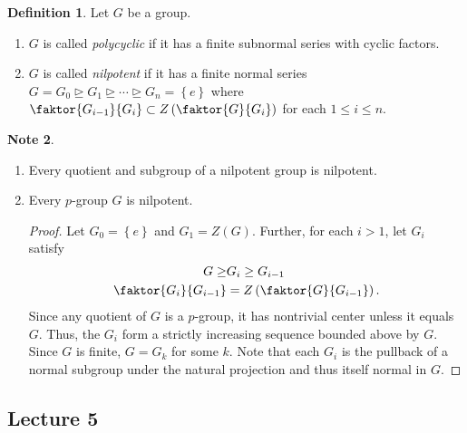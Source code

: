 \documentclass[10pt,letterpaper,cm]{nupset}
\theoremstyle{definition}
\newtheorem{definition}{Definition}[subsection]
\newtheorem{note}[definition]{Note}
\theoremstyle{theorem}
\theoremstyle{remark}
\newcommand{\1}{\mathbf{1}}
\newcommand{\0}{\vec 0}
\begin{document}
\begin{definition}{Let $G$ be a group.}
\begin{enumerate}
\item $G$ is called \textit{polycyclic} if it has a finite subnormal series with cyclic factors.
\item $G$ is called \textit{nilpotent} if it has a finite normal series  $G =G_0 \unrhd G_1 \unrhd \cdots \unrhd G_n = \left\{e\right\}$ where $\faktor{G_{i-1}}{G_i}\subset Z\left(\faktor{G}{G_i}\right)$ for each $1\leq i\leq n$.
\end{enumerate}
\end{definition}

\begin{note} $ $
\begin{enumerate}
\item Every quotient and subgroup of a nilpotent group is nilpotent. 
\item Every $p$-group $G$ is nilpotent. 
\begin{proof}
Let $G_0 = \left\{e\right\}$ and $G_1 = Z(G)$. Further, for each $i>1$, let $G_{i}$ satisfy 
\begin{align*}
G  \geq & G_i \geq G_{i-1}
\\ \faktor{G_i}{G_{i-1}} & = Z\left(\faktor{G}{G_{i-1}}\right).
\end{align*}
 Since any quotient of $G$ is a $p$-group, it has nontrivial center unless it equals $G$.  Thus, the $G_i$ form a strictly increasing sequence bounded above by $G$. Since $G$ is finite, $G = G_k$ for some $k$. Note that each $G_i$ is the pullback of a normal subgroup under the natural projection and thus itself normal in $G$.
\end{proof}
\end{enumerate}
\end{note}

\subsection{Lecture 5}
\end{document}

